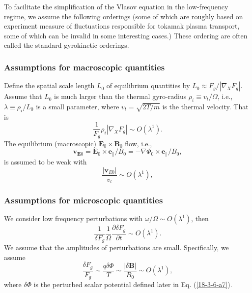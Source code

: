 \documentclass{article}
\begin{document}
To facilitate the simplification of the Vlasov equation in the low-frequency
regime, we assume the following orderings (some of which are roughly based on
experiment measure of fluctuations responsible for tokamak plasma transport,
some of which can be invalid in some interesting cases.) These ordering are
often called the standard gyrokinetic orderings.

\subsubsection{Assumptions for macroscopic quantities}

Define the spatial scale length $L_0$ of equilibrium quantities by $L_0
\approx F_g / | \nabla_X F_g |$. Assume that $L_0$ is much larger than the
thermal gyro-radius $\rho_i \equiv v_t / \Omega$, i.e., $\lambda \equiv \rho_i
/ L_0$ is a small parameter, where $v_t = \sqrt{2 T / m}$ is the thermal
velocity. That is
\begin{equation}
  \label{17-5-15-1} \frac{1}{F_g} \rho_i | \nabla_X F_g | \sim O (\lambda^1) .
\end{equation}
The equilibrium (macroscopic) $\mathbf{E}_0 \times \mathbf{B}_0$ flow, i.e.,
\begin{equation}
  \mathbf{v}_{\mathbf{E}0} =\mathbf{E}_0 \times \mathbf{e}_{\parallel} / B_0 =
  - \nabla \Phi_0 \times \mathbf{e}_{\parallel} / B_0,
\end{equation}
is assumed to be weak with
\begin{equation}
  \frac{| \mathbf{v}_{E 0} |}{v_t} \sim O (\lambda^1),
\end{equation}

\subsubsection{Assumptions for microscopic quantities}

We consider low frequency perturbations with $\omega / \Omega \sim O
(\lambda^1)$, then
\begin{equation}
  \frac{1}{\delta F_g} \frac{1}{\Omega} \frac{\partial \delta F_g}{\partial t}
  \sim O (\lambda^1) .
\end{equation}
We assume that the amplitudes of perturbations are small. Specifically, we
assume
\begin{equation}
  \frac{\delta F_g}{F_g} \sim \frac{q \delta \Phi}{T} \sim \frac{| \delta
  \mathbf{B} |}{B_0} \sim O (\lambda^1),
\end{equation}
where $\delta \Phi$ is the perturbed scalar potential defined later in Eq.
(\ref{18-3-6-a7}).
\end{document}
